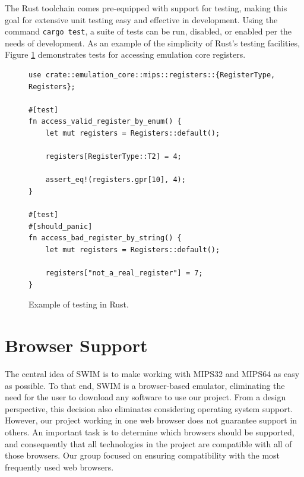 \documentclass[
    paper=letter,
    parskip=half,
    fontsize=12pt,
    titlepage=firstiscover,
    toc=bibliography,
    numbers=endperiod
]{scrartcl}
\let\oldsection\section
\renewcommand{\section}{\newpage\oldsection}
\begin{document}
The Rust toolchain comes pre-equipped with support for testing, making
this goal for extensive unit testing easy and effective in development.
Using the command \texttt{cargo test}, a suite of tests can be run,
disabled, or enabled per the needs of development. As an example of the
simplicity of Rust's testing facilities, Figure
\ref{fig:testing-registers-example} demonstrates tests for accessing
emulation core registers.

\begin{figure}[H]
    \begin{Verbatim}[frame=single, framesep=2mm, label=src/tests/emulation\_core/registers.rs]
use crate::emulation_core::mips::registers::{RegisterType, Registers};

#[test]
fn access_valid_register_by_enum() {
    let mut registers = Registers::default();

    registers[RegisterType::T2] = 4;

    assert_eq!(registers.gpr[10], 4);
}

#[test]
#[should_panic]
fn access_bad_register_by_string() {
    let mut registers = Registers::default();

    registers["not_a_real_register"] = 7;
}
    \end{Verbatim}
    \caption{Example of testing in Rust.}
    \label{fig:testing-registers-example}
\end{figure}



\section{Browser Support}
\label{sec:browser-support}

The central idea of SWIM is to make working with MIPS32 and MIPS64 as
easy as possible. To that end, SWIM is a browser-based emulator,
eliminating the need for the user to download any software to use our
project. From a design perspective, this decision also eliminates
considering operating system support. However, our project working in
one web browser does not guarantee support in others. An important task
is to determine which browsers should be supported, and consequently
that all technologies in the project are compatible with all of those
browsers. Our group focused on ensuring compatibility with the most
frequently used web browsers.
\end{document}
